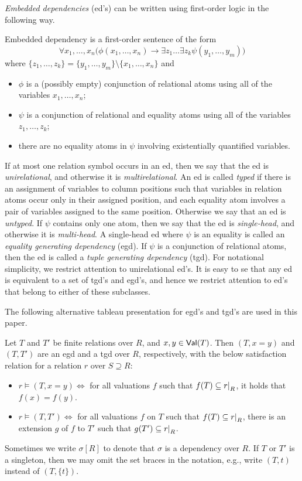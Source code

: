 \documentclass[envcountset]{llncs}
\newcommand{\problemFont}[1]{\protect\ensuremath{\mathsf{#1}}}
\newcommand{\si}{\sigma}
\newcommand{\sub}{\subseteq}
\newcommand{\on}{\exists}
\newcommand\re[2]{{\left.\kern-\nulldelimiterspace #1 \vphantom{|} \right|_{#2} }}
\newcommand{\Val}{\problemFont{Val}}
\begin{document}
\emph{Embedded dependencies} (ed's) can be written using first-order logic in the following way.
\begin{definition}
Embedded dependency is a first-order sentence of the form
$$\forall x_1, \ldots ,x_n \big ( \phi(x_1, \ldots, x_n) \rightarrow \on z_1 \ldots \on z_k\psi(y_1, \ldots ,y_m)\big )$$
where $\{z_1, \ldots ,z_k\} = \{y_1, \ldots ,y_m\}\setminus \{x_1, \ldots ,x_n\}$ and
\begin{itemize}
\item $\phi$ is a (possibly empty) conjunction of relational atoms using all of the variables $x_1, \ldots ,x_n$;
\item $\psi$ is a conjunction of relational and equality atoms using all of the variables $z_1, \ldots ,z_k$; 
\item there are no equality atoms in $\psi$ involving existentially quantified variables.
\end{itemize}

\end{definition}
If at most one relation symbol occurs in an ed, then we say that the ed is \emph{unirelational}, and otherwise it is \emph{multirelational}. An ed is called \emph{typed} if there is an assignment of variables to column positions such that variables in relation atoms occur only in their assigned position, and each equality atom involves a pair of variables assigned to the same position. Otherwise we say that an ed is \emph{untyped}. If $\psi$ contains only one atom, then we say that the ed is \emph{single-head}, and otherwise it is \emph{multi-head}.
A single-head ed where $\psi$ is an equality is called an \emph{equality generating dependency} (egd). If $\psi$ is a conjunction of relational atoms, then the ed is called a \emph{tuple generating dependency} (tgd). For notational simplicity, we restrict attention to unirelational ed's. It is easy to se that any ed is equivalent to a set of tgd's and egd's, and hence we restrict attention to ed's that belong to either of these subclasses. 


The following alternative tableau presentation for egd's and tgd's are used in this paper. \begin{definition}
Let $T$ and $T'$ be finite relations over $ R$, and $x,y\in \Val(T)$. Then $(T,x=y)$ and $(T,T')$ are an egd and a tgd over $R$, respectively, with the below satisfaction relation for a relation  $r$ over $S\supseteq R$:
\begin{itemize}
\item $r \models (T, x =  y) \Leftrightarrow$  for all valuations $f$ such that $f(T) \sub \re{r}{R}$, it holds that  $f(x)=f(y)$.
\item $r \models (T,T') \Leftrightarrow$   for all valuations $f$ on $T$ such that $f(T)\sub \re{r}{R}$, there is an extension $g$ of $f$ to $T'$ such that $g(T')\sub \re{r}{R}$. 
\end{itemize}
\end{definition}
Sometimes we write $\si[R]$ to denote that $\si$ is a dependency over $R$. 
If $T$ or $T'$ is a singleton, then we may omit the set braces in the notation, e.g., write $(T,t)$ instead of $(T,\{t\})$. 
\end{document}
